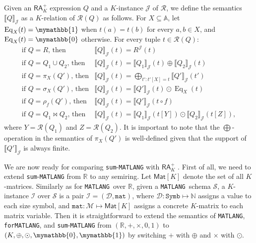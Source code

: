 \documentclass[sigconf]{acmart}
\newcommand{\NN}{\mathbb{N}}
\newcommand{\RR}{\mathbb{R}}
\newcommand{\Mnam}{\mathcal{M}}
\newcommand{\I}{\mathcal{I}}
\newcommand{\Sch}{\mathcal{S}}
\newcommand{\mtr}[1]{\textsf{Mat}[#1]}
\newcommand{\dom}{\mathcal{D}}
\newcommand{\conc}{\texttt{mat}}
\newcommand{\DD}{\texttt{Symb}}
\newcommand{\lang}{\texttt{MATLANG}\xspace}
\newcommand{\langfor}{\texttt{for}\text{-}\texttt{MATLANG}\xspace}
\newcommand{\langsum}{\texttt{sum}-\texttt{MATLANG}\xspace}
\newcommand{\att}{\mathbb{A}}
\newcommand{\cJ}{\mathcal{J}}
\newcommand{\cR}{\mathcal{R}}
\newcommand{\ksum}{\oplus}
\newcommand{\kprod}{\odot}
\newcommand{\bigksum}{\bigoplus}
\newcommand{\kzero}{\mymathbb{0}}
\newcommand{\kone}{\mymathbb{1}}
\newcommand{\arae}{Q}
\newcommand{\ssem}[2]{\llbracket #1 \rrbracket_{#2}}
\begin{document}
Given an $\mathsf{RA}_{K}^+$ expression $\arae$ and a $K$-instance $\cJ$ of $\cR$, we define the semantics $\ssem{\arae}{\cJ}$ as a $K$-relation of $\cR(\arae)$ as follows. For $X \subseteq \att$, let $\operatorname{Eq}_X(t) = \kone$ when $t(a) = t(b)$ for every $a, b \in X$, and $\operatorname{Eq}_X(t) = \kzero$ otherwise. For every tuple $t \in \cR(\arae)$:
$$
\begin{array}{ll}
\!\!\!\text{if $\arae = R$, then} & \ssem{\arae}{\cJ}(t) = R^\cJ(t) \\
\!\!\!\text{if $\arae = \arae_1 \cup \arae_2$, then} & \ssem{\arae}{\cJ}(t) = \ssem{\arae_1}{\cJ}(t) \ksum \ssem{\arae_2}{\cJ}(t)  \\
\!\!\!\text{if $\arae = \pi_X(\arae')$, then} & \ssem{\arae}{\cJ}(t) = \bigksum_{t': t'[X] = t} \ssem{\arae'}{\cJ}(t') \\
\!\!\!\text{if $\arae = \sigma_X(\arae')$, then} & \ssem{\arae}{\cJ}(t) = 
\ssem{\arae'}{\cJ}(t) \kprod \operatorname{Eq}_X(t)  \\
\!\!\!\text{if $\arae = \rho_f(\arae')$, then} & \ssem{\arae}{\cJ}(t) = 
\ssem{\arae'}{\cJ}(t \circ f)  
\\
\!\!\!\text{if $\arae = \arae_1 \bowtie \arae_2$, then} & \ssem{\arae}{\cJ}(t) =  \ssem{\arae_1}{\cJ}(t[Y]) \kprod  \ssem{\arae_2}{\cJ}(t[Z]),
\end{array}
$$
where $Y = \cR(\arae_1)$ and $Z = \cR(\arae_2)$. It is important to note that the $\bigksum$-operation in the semantics of $\pi_X(\arae')$ is well-defined given that the support of $\ssem{\arae'}{\cJ}$ is always finite. 

We are now ready for comparing \langsum with $\mathsf{RA}_{K}^+$ . First of all, we need to extend \langsum from $\RR$ to any semiring. Let $\mtr{K}$ denote the set of all $K$-matrices. 
Similarly as for \lang\ over $\RR$, given a \lang\ schema $\Sch$, a $K$-instance $\I$ over $\Sch$ is a pair $\I = (\dom,\conc)$, where $\dom : \DD \mapsto \NN$ assigns a value to each size symbol, and $\conc : \Mnam \mapsto \mtr{K}$ assigns a concrete $K$-matrix to each matrix variable. Then it is straightforward to extend the semantics of \lang, \langfor, and \langsum from $(\RR, +, \times, 0, 1)$ to $(K, \ksum, \kprod, \kzero, \kone)$ by switching $+$ with $\ksum$ and $\times$ with $\kprod$. 
\end{document}
